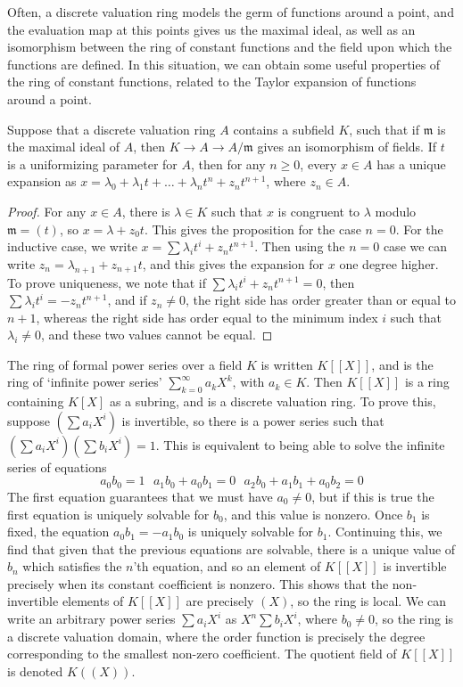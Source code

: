 Often, a discrete valuation ring models the germ of functions around a point, and the evaluation map at this points gives us the maximal ideal, as well as an isomorphism between the ring of constant functions and the field upon which the functions are defined. In this situation, we can obtain some useful properties of the ring of constant functions, related to the Taylor expansion of functions around a point.

\begin{prop}
    Suppose that a discrete valuation ring $A$ contains a subfield $K$, such that if $\mathfrak{m}$ is the maximal ideal of $A$, then $K \to A \to A/\mathfrak{m}$ gives an isomorphism of fields. If $t$ is a uniformizing parameter for $A$, then for any $n \geq 0$, every $x \in A$ has a unique expansion as $x = \lambda_0 + \lambda_1 t + \dots + \lambda_n t^n + z_nt^{n+1}$, where $z_n \in A$.
\end{prop}
\begin{proof}
    For any $x \in A$, there is $\lambda \in K$ such that $x$ is congruent to $\lambda$ modulo $\mathfrak{m} = (t)$, so $x = \lambda + z_0t$. This gives the proposition for the case $n = 0$. For the inductive case, we write $x = \sum \lambda_i t^i + z_n t^{n+1}$. Then using the $n = 0$ case we can write $z_n = \lambda_{n+1} + z_{n+1}t$, and this gives the expansion for $x$ one degree higher. To prove uniqueness, we note that if $\sum \lambda_i t^i + z_n t^{n+1} = 0$, then $\sum \lambda_i t^i = -z_n t^{n+1}$, and if $z_n \neq 0$, the right side has order greater than or equal to $n+1$, whereas the right side has order equal to the minimum index $i$ such that $\lambda_i \neq 0$, and these two values cannot be equal.
\end{proof}

The ring of formal power series over a field $K$ is written $K[[X]]$, and is the ring of `infinite power series' $\sum_{k = 0}^\infty a_k X^k$, with $a_k \in K$. Then $K[[X]]$ is a ring containing $K[X]$ as a subring, and is a discrete valuation ring. To prove this, suppose $\left( \sum a_i X^i \right)$ is invertible, so there is a power series such that $\left( \sum a_i X^i \right) \left( \sum b_i X^i \right) = 1$. This is equivalent to being able to solve the infinite series of equations
%
\[ a_0b_0 = 1\ \ \ a_1b_0 + a_0b_1 = 0\ \ \ a_2b_0 + a_1b_1 + a_0b_2 = 0 \]
%
The first equation guarantees that we must have $a_0 \neq 0$, but if this is true the first equation is uniquely solvable for $b_0$, and this value is nonzero. Once $b_1$ is fixed, the equation $a_0b_1 = -a_1b_0$ is uniquely solvable for $b_1$. Continuing this, we find that given that the previous equations are solvable, there is a unique value of $b_n$ which satisfies the $n$'th equation, and so an element of $K[[X]]$ is invertible precisely when its constant coefficient is nonzero. This shows that the non-invertible elements of $K[[X]]$ are precisely $(X)$, so the ring is local. We can write an arbitrary power series $\sum a_i X^i$ as $X^n \sum b_i X^i$, where $b_0 \neq 0$, so the ring is a discrete valuation domain, where the order function is precisely the degree corresponding to the smallest non-zero coefficient. The quotient field of $K[[X]]$ is denoted $K((X))$.

